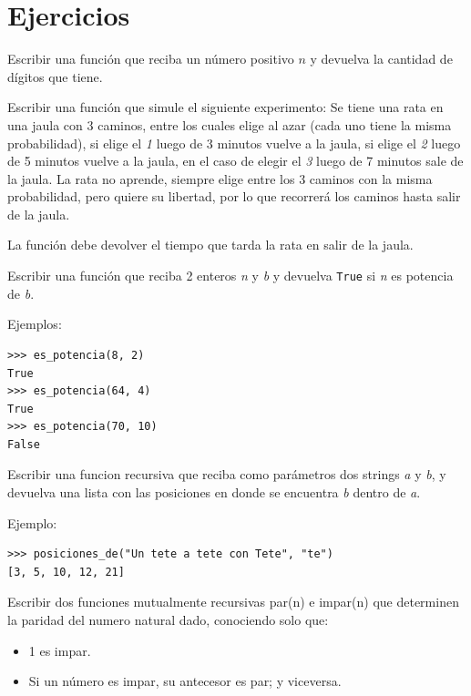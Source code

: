 \newpage
\section{Ejercicios}

\begin{ejercicio}
Escribir una función que reciba un número positivo $n$ y devuelva
la cantidad de dígitos que tiene.
\end{ejercicio}

\begin{ejercicio}
Escribir una función que simule el siguiente experimento:
Se tiene una rata en una jaula con 3 caminos, entre los cuales elige
al azar (cada uno tiene la misma probabilidad), si elige el {\it 1} luego
de 3 minutos vuelve a la jaula, si elige el {\it 2} luego de 5 minutos vuelve a
la jaula, en el caso de elegir el {\it 3} luego de 7 minutos sale de la jaula.
La rata no aprende, siempre elige entre los 3 caminos con la misma probabilidad,
pero quiere su libertad, por lo que recorrerá los caminos hasta salir de la jaula.

La función debe devolver el tiempo que tarda la rata en salir de la jaula.
\end{ejercicio}

\begin{ejercicio}
Escribir una función que reciba 2 enteros {\it n} y {\it b} y devuelva
\verb!True! si {\it n} es potencia de {\it b}.

Ejemplos:
\begin{verbatim}
>>> es_potencia(8, 2)
True
>>> es_potencia(64, 4)
True
>>> es_potencia(70, 10)
False
\end{verbatim}
\end{ejercicio}

\begin{ejercicio}
Escribir una funcion recursiva que reciba como parámetros dos strings {\it a} y
{\it b}, y devuelva una lista con las posiciones en donde se encuentra {\it b}
dentro de {\it a}.

Ejemplo:
\begin{verbatim}
>>> posiciones_de("Un tete a tete con Tete", "te")
[3, 5, 10, 12, 21]
\end{verbatim}
\end{ejercicio}

\begin{ejercicio}
Escribir dos funciones mutualmente recursivas par(n) e impar(n) que
determinen la paridad del numero natural dado, conociendo solo que:
\begin{itemize}
    \item 1 es impar.
    \item Si un número es impar, su antecesor es par; y viceversa.
\end{itemize}
\end{ejercicio}

